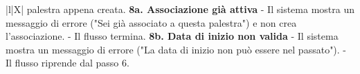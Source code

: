 \documentclass[../../../../SoftwareRequirementsSpecification.tex]{subfiles}
\begin{document}
\begin{xltabular}{\textwidth}{|l|X|}
{    palestra appena creata. \newline
    \textbf{8a. Associazione già attiva} \newline
    - Il sistema mostra un messaggio di errore ("Sei già associato a
    questa palestra") e non crea l'associazione. \newline
    - Il flusso termina. \newline
    \textbf{8b. Data di inizio non valida} \newline
    - Il sistema mostra un messaggio di errore ("La data di inizio non
    può essere nel passato"). \newline
    - Il flusso riprende dal passo 6.
  } \\ \hline
   \\ \hline
\end{xltabular}
\end{document}
